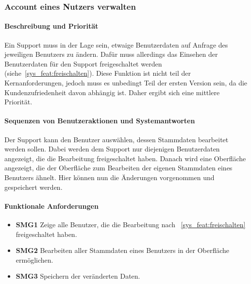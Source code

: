 \subsubsection{Account eines Nutzers verwalten}
\label{sysf:support_account_verwalten}
\paragraph{Beschreibung und Priorität}
Ein Support muss in der Lage sein, etwaige Benutzerdaten auf Anfrage des jeweiligen Benutzers zu ändern.
Dafür muss allerdings das Einsehen der Benutzerdaten für den Support freigeschaltet werden (siehe~\ref{sys_feat:freischalten}).
Diese Funktion ist nicht teil der Kernanforderungen, jedoch muss es unbedingt Teil der ersten Version sein,
da die Kundenzufriedenheit davon abhängig ist.
Daher ergibt sich eine mittlere Priorität.
\paragraph{Sequenzen von Benutzeraktionen und Systemantworten}
Der Support kann den Benutzer auswählen, dessen Stammdaten bearbeitet werden sollen.
Dabei werden dem Support nur diejenigen Benutzerdaten angezeigt, die die Bearbeitung freigeschaltet haben.
Danach wird eine Oberfläche angezeigt, die der Oberfläche zum Bearbeiten der eigenen Stammdaten eines Benutzers
ähnelt.
Hier können nun die Änderungen vorgenommen und gespeichert werden.
\paragraph{Funktionale Anforderungen}
\begin{itemize}
	\item \textbf{SMG1} Zeige alle Benutzer, die die Bearbeitung nach ~\ref{sys_feat:freischalten} freigeschaltet haben.
	\item \textbf{SMG2} Bearbeiten aller Stammdaten eines Benutzers in der Oberfläche ermöglichen.
	\item \textbf{SMG3} Speichern der veränderten Daten.
\end{itemize}





